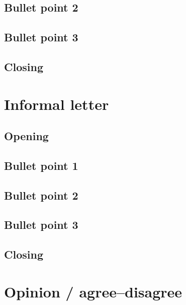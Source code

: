 \documentclass[11pt,a4paper]{article}
\begin{document}
\subsection*{Bullet point 2}
\vspace{1cm}
\subsection*{Bullet point 3}
\vspace{1cm}
\subsection*{Closing}
\vspace{1cm}
\clearpage
\section*{Informal letter}
\subsection*{Opening}
\vspace{1cm}
\subsection*{Bullet point 1}
\vspace{1cm}
\subsection*{Bullet point 2}
\vspace{1cm}
\subsection*{Bullet point 3}
\vspace{1cm}
\subsection*{Closing}
\vspace{1cm}
\clearpage
\section*{Opinion / agree--disagree}
\end{document}
